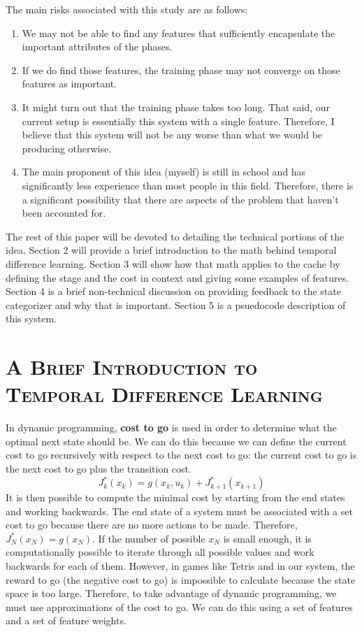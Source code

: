 \documentclass[11pt]{article}
\numberwithin{figure}{section}
\begin{document}
		The main risks associated with this study are as follows:
		\begin{enumerate}
			\item We may not be able to find any features that sufficiently encapsulate the important attributes of the phases.
			\item If we do find those features, the training phase may not converge on those features as important.
			\item It might turn out that the training phase takes too long. That said, our current setup is essentially this system with a single feature. Therefore, I believe that this system will not be any worse than what we would be producing otherwise.
			\item The main proponent of this idea (myself) is still in school and has significantly less experience than most people in this field. Therefore, there is a significant possibility that there are aspects of the problem that haven't been accounted for.
		\end{enumerate}
		
		The rest of this paper will be devoted to detailing the technical portions of the idea. Section 2 will provide a brief introduction to the math behind temporal difference learning. Section 3 will show how that math applies to the cache by defining the stage and the cost in context and giving some examples of features. Section 4 is a brief non-technical discussion on providing feedback to the state categorizer and why that is important. Section 5 is a psuedocode description of this system. 

	\section{\textsc{A Brief Introduction to Temporal Difference Learning}}		
		In dynamic programming, \textbf{cost to go} is used in order to determine what the optimal next state should be. We can do this because we can define the current cost to go recursively with respect to the next cost to go: the current cost to go is the next cost to go plus the transition cost.
		\begin{equation}
		J^*_k(x_k)=g(x_k,u_k)+J^*_{k+1}(x_{k+1})
		\end{equation}
		It is then possible to compute the minimal cost by starting from the end states and working backwards. The end state of a system must be associated with a set cost to go because there are no more actions to be made. Therefore, \begin{math}J^*_N(x_N)=g(x_N)\end{math}. If the number of possible \begin{math}x_N\end{math} is small enough, it is computationally possible to iterate through all possible values and work backwards for each of them. However, in games like Tetris and in our system, the reward to go (the negative cost to go) is impossible to calculate because the state space is too large. Therefore, to take advantage of dynamic programming, we must use approximations of the cost to go. We can do this using a set of features and a set of feature weights. \\
		
\end{document}
